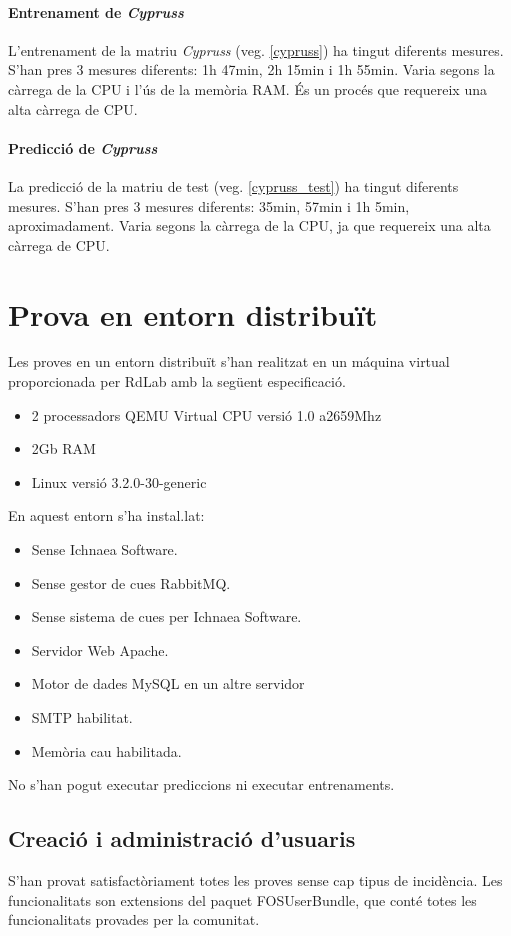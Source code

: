 \paragraph{Entrenament de \textit{Cypruss}}
L'entrenament de la matriu \textit{Cypruss} (veg. \ref{cypruss}) ha tingut diferents mesures. S'han pres 3 mesures diferents: 1h 47min, 2h 15min i 1h 55min. Varia segons la c\`{a}rrega de la CPU i l'\'{u}s de la memòria RAM. \'{E}s un proc\'{e}s que requereix una alta c\`{a}rrega de CPU.

\paragraph{Predicci\'{o} de \textit{Cypruss}}
La predicci\'{o} de la matriu de test (veg. \ref{cypruss_test}) ha tingut diferents mesures. S'han pres 3 mesures diferents: 35min, 57min i 1h 5min, aproximadament. Varia segons la c\`{a}rrega de la CPU, ja que requereix una alta c\`{a}rrega de CPU.

\section{Prova en entorn distribuït}
Les proves en un entorn distribuït s'han realitzat en un m\'{a}quina virtual proporcionada per RdLab amb la següent especificaci\'{o}.

\begin{itemize}
\item 2 processadors QEMU Virtual CPU versió 1.0 a2659Mhz
\item 2Gb RAM	
\item Linux versió 3.2.0-30-generic
\end{itemize}
En aquest entorn s'ha instal.lat:
\begin{itemize}
\item Sense Ichnaea Software.
\item Sense gestor de cues RabbitMQ.
\item Sense sistema de cues per Ichnaea Software.
\item Servidor Web Apache.
\item Motor de dades MySQL en un altre servidor
\item SMTP habilitat.
\item Memòria cau habilitada.
\end{itemize}
No s'han pogut executar prediccions ni executar entrenaments.

\subsection*{Creaci\'{o} i administraci\'{o} d'usuaris}
S'han provat satisfactòriament totes les proves sense cap tipus de incid\`{e}ncia. Les funcionalitats son extensions del paquet FOSUserBundle, que cont\'{e} totes les funcionalitats provades per la comunitat. 


